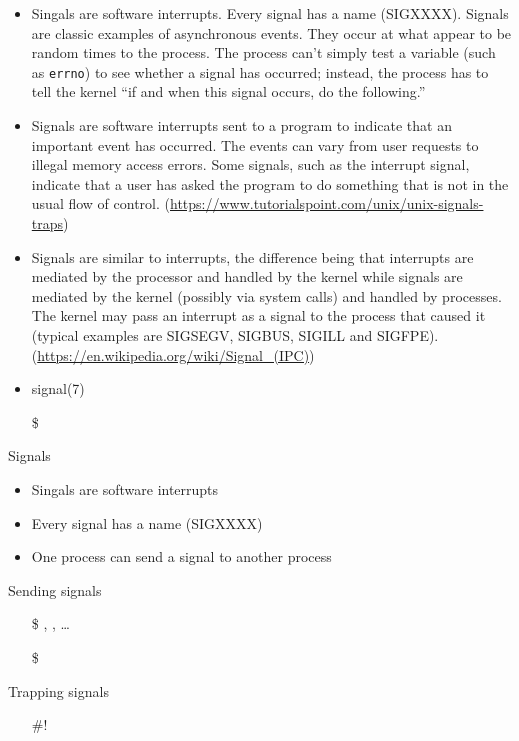 \begin{itemize}
\item Singals are software interrupts. Every signal has a name (SIGXXXX). Signals are
  classic examples of asynchronous events. They occur at what appear to be random times to
  the process. The process can't simply test a variable (such as \texttt{errno}) to see
  whether a signal has occurred; instead, the process has to tell the kernel ``if and when
  this signal occurs, do the following.'' 
\item Signals are software interrupts sent to a program to indicate that an important
  event has occurred. The events can vary from user requests to illegal memory access
  errors. Some signals, such as the interrupt signal, indicate that a user has asked the
  program to do something that is not in the usual flow of
  control. (\url{https://www.tutorialspoint.com/unix/unix-signals-traps})
\item Signals are similar to interrupts, the difference being that interrupts are mediated
  by the processor and handled by the kernel while signals are mediated by the kernel
  (possibly via system calls) and handled by processes. The kernel may pass an interrupt
  as a signal to the process that caused it (typical examples are SIGSEGV, SIGBUS, SIGILL
  and SIGFPE). (\url{https://en.wikipedia.org/wiki/Signal_(IPC)})
\item signal(7)
\item[\$] 
\end{itemize}

\begin{frame}{Signals}
  \begin{itemize}
  \item Singals are software interrupts
  \item Every signal has a name (SIGXXXX)
  \item One process can send a signal to another process
  \end{itemize}
  \begin{block}{Sending signals}
    \begin{itemize}
    \item[\$] \Cc, \Cz, \ldots
    \item[\$] 
    \end{itemize}
  \end{block}
  \begin{block}{Trapping signals}
    \begin{itemize}
    \item[\#!] 
    \end{itemize}
  \end{block}
\end{frame}

